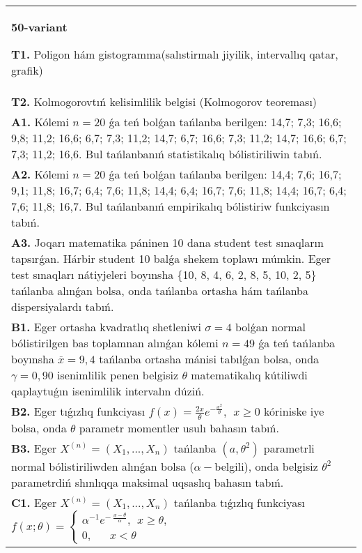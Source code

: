 \documentclass{article}
\begin{document}
\begin{tabular}{m{17cm}}
\textbf{50-variant}
\newline

\textbf{T1.} 
Poligon hám gistogramma(salıstirmalı jiyilik, intervallıq qatar, grafik)
 \\
\textbf{T2.} 
Kolmogorovtıń kelisimlilik belgisi (Kolmogorov teoreması)
 \\
\textbf{A1.} 
Kólemi \(n = 20\) ǵa teń bolǵan tańlanba berilgen: 14,7; 7,3; 16,6; 9,8; 11,2; 16,6; 6,7; 7,3; 11,2; 14,7; 6,7; 16,6; 7,3; 11,2; 14,7; 16,6; 6,7; 7,3; 11,2; 16,6. Bul tańlanbanıń statistikalıq bólistiriliwin tabıń.
 \\
\textbf{A2.} 
Kólemi \(n = 20\) ǵa teń bolǵan tańlanba berilgen: 14,4; 7,6; 16,7; 9,1; 11,8; 16,7; 6,4; 7,6; 11,8; 14,4; 6,4; 16,7; 7,6; 11,8; 14,4; 16,7; 6,4; 7,6; 11,8; 16,7. Bul tańlanbanıń empirikalıq bólistiriw funkciyasın tabıń.
 \\
\textbf{A3.} 
Joqarı matematika páninen 10 dana student test sınaqların tapsırǵan. Hárbir student 10 balǵa shekem toplawı múmkin. Eger test sınaqları nátiyjeleri boyınsha \{10, 8, 4, 6, 2, 8, 5, 10, 2, 5\} tańlanba alınǵan bolsa, onda tańlanba ortasha hám tańlanba dispersiyalardı tabıń.
 \\
\textbf{B1.} 
Eger ortasha kvadratlıq shetleniwi \(\sigma = 4\) bolǵan normal bólistirilgen bas toplamnan alınǵan kólemi \(n = 49\) ǵa teń tańlanba boyınsha \(\overline{x} = 9,4\) tańlanba ortasha mánisi tabılǵan bolsa, onda \(\gamma = 0,90\) isenimlilik penen belgisiz \(\theta\) matematikalıq kútiliwdi qaplaytuǵın isenimlilik intervalın dúziń.
 \\
\textbf{B2.} 
Eger tıǵızlıq funkciyası \(f(x) = \frac{2x}{\theta}e^{- \frac{x^{2}}{\theta}},\ \ x \geq 0\) kóriniske iye bolsa, onda \(\theta\) parametr momentler usulı bahasın tabıń.
 \\
\textbf{B3.} 
Eger \(X^{(n)} = \left( X_{1},...,X_{n} \right)\) tańlanba \(\left( a,\theta^{2} \right)\) parametrli normal bólistiriliwden alınǵan bolsa (\(\alpha -\)belgili), onda belgisiz \(\theta^{2}\) parametrdiń shınlıqqa maksimal uqsaslıq bahasın tabıń.
 \\
\textbf{C1.} 
Eger \(X^{(n)} = \left( X_{1},...,X_{n} \right)\) tańlanba tıǵızlıq funkciyası
$f(x;\theta) = \left\{ \begin{array}{r}
\alpha^{- 1}e^{- \ \frac{x - \theta}{\alpha}},\ \ x \geq \theta, \\
0,\ \ \ \ \ \ \ x < \theta
\end{array} \right.\ $

\end{tabular}
\end{document}
